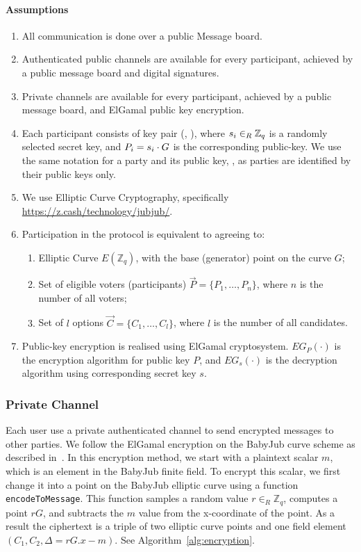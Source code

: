 \documentclass{article}
\begin{document}
\paragraph*{Assumptions}
\begin{enumerate}
    \item All communication is done over a public Message board.
    \item Authenticated public channels are available for every participant, achieved by a public message board and digital signatures.
    \item Private channels are available for every participant, achieved by a public message board, and ElGamal public key encryption.
    \item Each participant  consists of key pair (, ), where $s_{i} \in_{R} \mathbb{Z}_q$ is a randomly selected secret key, and $P_{i} = s_{i} \cdot G$ is the corresponding public-key. We use the same notation for a party and its public key, , as parties are identified by their public keys only.
    \item We use Elliptic Curve Cryptography, specifically \href{babyJubJub curve}{https://z.cash/technology/jubjub/}.
    \item Participation in the protocol is equivalent to agreeing to: \begin{enumerate}
        \item Elliptic Curve $E(\mathbb{Z}_q)$, with the base (generator) point on the curve $G$;
        \item Set of eligible voters (participants) $\vec{P}=\{P_1,\dots,P_n\}$, where $n$ is the number of all voters;
        \item Set of $l$ options $\vec{C}=\{C_1, \dots, C_l\}$, where $l$ is the number of all candidates. %
    \end{enumerate}
    \item Public-key encryption is realised using ElGamal cryptosystem. $EG_{P}(\cdot)$ is the encryption algorithm for public key $P$, and $EG_{s}(\cdot)$ is the decryption algorithm using corresponding secret key $s$.
\end{enumerate}

\subsubsection{Private Channel}

Each user use a private authenticated channel to send encrypted messages to other parties. We follow the ElGamal encryption on the BabyJub curve scheme as described in~\cite{ElGamalEncryptionDecryption2020,jieWeijiekohElgamalbabyjub2023}.  In this encryption method, we start with a plaintext scalar $m$, which is an element in the BabyJub finite field. To encrypt this scalar, we first change it into a point on the BabyJub elliptic curve using a function \texttt{encodeToMessage}. This function samples a random value \( r \in_{R} \mathbb{Z}_q\), computes a point \( rG \), and subtracts the $m$ value from the x-coordinate of the point. As a result the ciphertext is a triple of two elliptic curve points and one field element $(C_1, C_2, \Delta=rG.x - m)$. See Algorithm~\ref{alg:encryption}.
\end{document}
